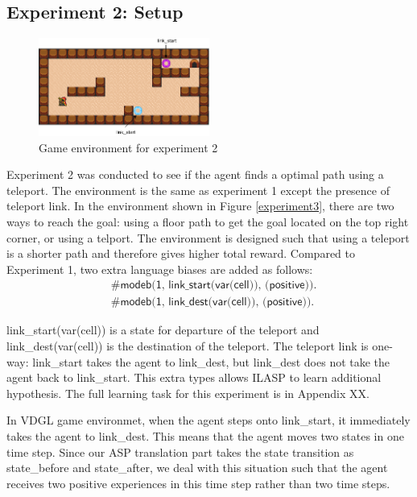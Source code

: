 \subsection{Experiment 2: Setup}
\label{subsec:experiement2_setup}
\begin{figure}[!htb]
\centering
\includegraphics[width=0.5\textwidth]{./figures/experiment2_setup}
\caption{Game environment for experiment 2}
\label{experiment2}
\end{figure}
Experiment 2 was conducted to see if the agent finds a optimal path using a teleport. The environment is the same as experiment 1 except the presence of teleport link.
In the environment shown in Figure \ref{experiment3},
there are two ways to reach the goal: using a floor path to get the goal located on the top right corner, or using a telport.
The environment is designed such that using a teleport is a shorter path and therefore gives higher total reward.
Compared to Experiment 1, two extra language biases are added as follows:
\begin{equation*}
\begin{split}
&\textsf{\#modeb(1, link\_start(var(cell)), (positive)).}\\
&\textsf{\#modeb(1, link\_dest(var(cell)), (positive)).}
\end{split}
\end{equation*}

\textsf{link\_start(var(cell))} is a state for departure of the teleport and \textsf{link\_dest(var(cell))} is the destination of the teleport. 
The teleport link is one-way: \textsf{link\_start} takes the agent to \textsf{link\_dest}, but \textsf{link\_dest} does not take the agent back to \textsf{link\_start}.
This extra types allows ILASP to learn additional hypothesis.
The full learning task for this experiment is in Appendix XX.

In VDGL game environmet, when the agent steps onto \textsf{link\_start}, it immediately takes the agent to \textsf{link\_dest}. This means that the agent moves two states in one time step.
Since our ASP translation part takes the state transition as \textsf{state\_before} and \textsf{state\_after}, 
we deal with this situation such that the agent receives two positive experiences in this time step rather than two time steps.


